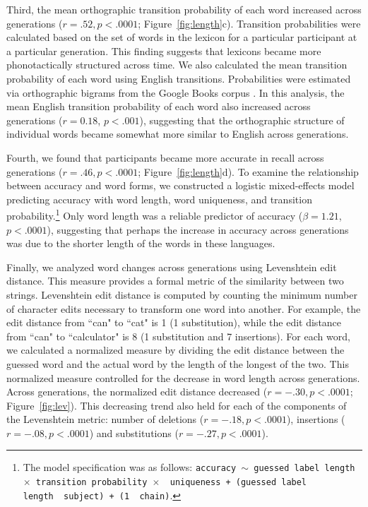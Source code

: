 Third, the mean orthographic transition probability of each word increased across generations ($r=.52, p<.0001$; Figure\ \ref{fig:length}c). Transition probabilities were calculated based on the set of words in the lexicon for a particular participant at a particular generation. This finding suggests that lexicons became more phonotactically structured across time. We also calculated the mean transition probability of each word using English transitions. Probabilities were estimated via orthographic bigrams from the Google Books corpus \cite{norvig}. In this analysis, the mean English transition probability of each word also increased across generations ($r=0.18$, $p <.001$), suggesting that the orthographic structure of individual words became somewhat more similar to English across generations. %


Fourth, we found that participants became more accurate in recall across generations ($r=.46, p<.0001$; Figure\ \ref{fig:length}d). To examine the relationship between accuracy and word forms, we constructed a logistic mixed-effects model predicting accuracy with word length, word uniqueness, and transition probability.\footnote{The model specification was as follows: \texttt{accuracy $\sim$ guessed label length~$\times$~transition probability~$\times$~ uniqueness + (guessed label length~\textbar~subject) +  (1~\textbar~chain)}.} Only word length was a reliable predictor of accuracy ($\beta=1.21$, $p <.0001$), suggesting that perhaps the increase in accuracy across generations was due to the shorter length of the words in these languages. %



Finally, we analyzed word changes across generations using Levenshtein edit distance. This measure provides a formal metric of the similarity between two strings. Levenshtein edit distance is computed by counting the minimum number of character edits necessary to transform one word into another. For example, the edit distance from ``can" to ``cat" is 1 (1 substitution), while the edit distance from ``can" to ``calculator" is 8 (1 substitution and 7 insertions). For each word, we calculated a normalized measure by dividing the edit distance between the guessed word and the actual word by the length of the longest of the two. This normalized measure controlled for the decrease in word length across generations.  Across generations, the normalized edit distance decreased ($r=-.30, p<.0001$; Figure\ \ref{fig:lev}). This decreasing trend also held for each of the components of the Levenshtein metric: number of deletions ($r=-.18, p<.0001$), insertions ($r=-.08, p<.0001$) and substitutions ($r=-.27, p<.0001$). 

